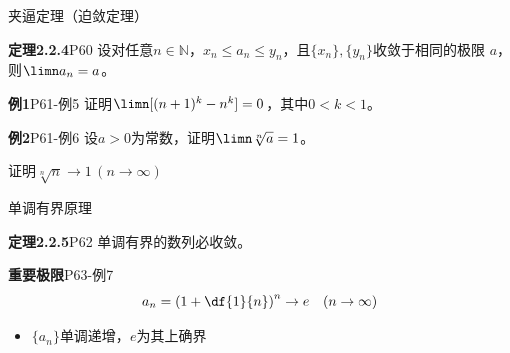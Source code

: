 \begin{frame}{夹逼定理（迫敛定理）}
	\linespread{1.2}\pause 
	\begin{block}{{\bf 定理2.2.4}\hfill P60}
		设对任意$n\in\mathbb{N}$，$x_n\le a_n\le y_n$，且$\{x_n\},\{y_n\}$收敛于相同的极限
		$a$，则$\limn a_n=a$。
	\end{block}
	\pause 
	\begin{center}
	\end{center}
\end{frame}

\begin{frame}
	\linespread{1.5}
	\begin{exampleblock}{{\bf 例1}\hfill P61-例5}
		证明$\limn [(n+1)^k-{n}^k]=0$，其中$0<k<1$。
	\end{exampleblock}
	\pause 
	\vspace{1em}
	\begin{exampleblock}{{\bf 例2}\hfill P61-例6}
		设$a>0$为常数，证明$\limn \sqrt[n]{a}=1$。
	\end{exampleblock}
	{}证明$\sqrt[n]n\to 1\,(n\to\infty)$
\end{frame}

\begin{frame}{单调有界原理}
	\linespread{1.2}\pause 
	\begin{block}{{\bf 定理2.2.5}\hfill P62}
		单调有界的数列必收敛。
	\end{block}
	\pause 
	\vspace{1em}
	\begin{alertblock}{{\bf 重要极限}\hfill P63-例7}
		$$a_n=\left(1+\df{1}{n}\right)^n\to e\quad (n\to\infty)$$
	\end{alertblock}
	\pause
	\begin{itemize}
	  \item $\{a_n\}$单调递增，$e$为其上确界
	\end{itemize}
\end{frame}

